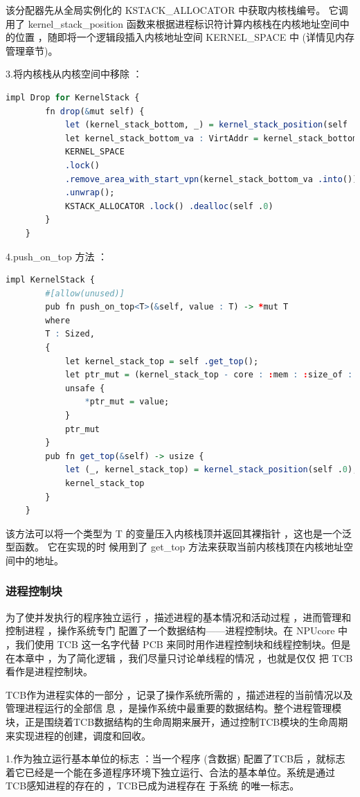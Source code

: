 该分配器先从全局实例化的 KSTACK\_ALLOCATOR 中获取内核栈编号。  它调用了  kernel\_stack\_position
函数来根据进程标识符计算内核栈在内核地址空间中的位置 ，随即将一个逻辑段插入内核地址空间 KERNEL\_SPACE 中  (详情见内存管理章节)。

3.将内核栈从内核空间中移除 ：
\begin{lstlisting}[language=R]
	impl Drop for KernelStack {
		fn drop(&mut self) {
			let (kernel_stack_bottom, _) = kernel_stack_position(self .0);
			let kernel_stack_bottom_va : VirtAddr = kernel_stack_bottom .into();
			KERNEL_SPACE
			.lock()
			.remove_area_with_start_vpn(kernel_stack_bottom_va .into())
			.unwrap();
			KSTACK_ALLOCATOR .lock() .dealloc(self .0)
		}
	}
\end{lstlisting}

4.push\_on\_top 方法 ：
\begin{lstlisting}[language=R]
	impl KernelStack {
		#[allow(unused)]
		pub fn push_on_top<T>(&self, value : T) -> *mut T
		where
		T : Sized,
		{
			let kernel_stack_top = self .get_top();
			let ptr_mut = (kernel_stack_top - core : :mem : :size_of : :<T>()) as *mut T;
			unsafe {
				*ptr_mut = value;
			}
			ptr_mut
		}
		pub fn get_top(&self) -> usize {
			let (_, kernel_stack_top) = kernel_stack_position(self .0);
			kernel_stack_top
		}
	}
\end{lstlisting}

该方法可以将一个类型为  T 的变量压入内核栈顶并返回其裸指针 ，这也是一个泛型函数。  它在实现的时 候用到了  get\_top 方法来获取当前内核栈顶在内核地址空间中的地址。

\subsubsection{进程控制块}
为了使并发执行的程序独立运行 ，描述进程的基本情况和活动过程 ，进而管理和控制进程 ，操作系统专门 配置了⼀个数据结构——进程控制块。在 NPUcore 中 ，我们使用 TCB 这一名字代替 PCB 来同时用作进程控制块和线程控制块。但是在本章中 ，为了简化逻辑 ，我们尽量只讨论单线程的情况 ，也就是仅仅 把 TCB 看作是进程控制块。

TCB作为进程实体的一部分 ，记录了操作系统所需的 ，描述进程的当前情况以及管理进程运行的全部信 息 ，是操作系统中最重要的数据结构。整个进程管理模块，正是围绕着TCB数据结构的生命周期来展开，通过控制TCB模块的生命周期来实现进程的创建，调度和回收。

1.作为独立运行基本单位的标志 ：当一个程序  (含数据)  配置了TCB后 ，就标志着它已经是一个能在多道程序环境下独立运行、合法的基本单位。系统是通过TCB感知进程的存在的 ，TCB已成为进程存在 于系统 的唯一标志。

